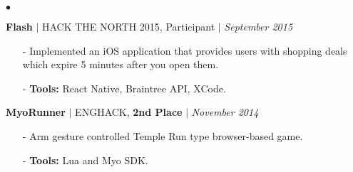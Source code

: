 \documentclass[11pt]{article}
\newenvironment{achievements}{\begin{list}{$\bullet$}{\topsep 0pt \itemsep -1.5pt \leftmargin 5pt}}{\vspace*{4pt}\end{list}}
\begin{document}
\begin{achievements}
\vspace{5pt}

\item \textbf{Flash} {$|$ \scriptsize HACK THE NORTH 2015, Participant} $|$  \href{https://github.com/nakulpathak3/Flash}{\faGithub} \hfill \textit {September 2015}
\begin{itemize}
\item[-] Implemented an iOS application that provides users with shopping deals which expire 5 minutes after you open them.
\vspace{2pt}
\item[-] \textbf{Tools:} React Native, Braintree API, XCode.
\end{itemize}

\vspace{5pt}

\item\textbf{MyoRunner} {$|$ \scriptsize ENGHACK, \textbf{2nd Place} }  $|$  \href{https://github.com/nakulpathak3/myorunner}{\faGithub} \hfill \textit {November 2014}
\begin{itemize}
\item[-]Arm gesture controlled Temple Run type browser-based game.
\vspace{2pt}
\item[-]\textbf{Tools:} Lua and Myo SDK.
\end{itemize}




\end{achievements}
\end{document}
